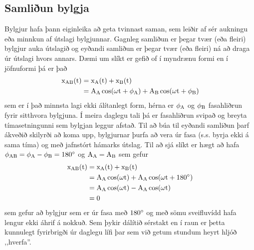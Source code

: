 \subsection{Samliðun bylgja}
Bylgjur hafa þann eiginleika að geta tvinnast saman, sem leiðir af sér aukningu
eða minnkun af útslagi bylgjunnar. Gagnleg samliðun er þegar tvær (eða fleiri)
bylgjur auka útslagið og eyðandi samliðun er þegar tvær (eða fleiri) ná að
draga úr útslagi hvors annars. Dæmi um slíkt er gefið of í myndrænu formi en
í jöfnuformi þá er það
\begin{align*}
	\text{x}_\text{AB}(\textrm{t}) &= \text{x}_\text{A}(\textrm{t}) + \text{x}_\text{B}(\textrm{t}) \\
		&= \text{A}_\text{A} \cos (\omega \textrm{t} + \phi_\text{A}) +
			\text{A}_\text{B} \cos (\omega \textrm{t} + \phi_\text{B}) \\
\end{align*}
sem er í það minnsta lagi ekki álítanlegt form, hérna er $\phi_\text{A}$ og
$\phi_\text{B}$ fasahliðrun fyrir sitthvora bylgjuna. Í meira daglegu tali
þá er fasahliðrun svipað og breyta tímasetningunni sem bylgjan leggur afstað.
Til að búa til eyðandi samliðun þarf ákveðið skilyrði að koma upp, bylgjurnar
þurfa að vera úr fasa (s.s. byrja ekki á sama tíma) og með jafnstórt hámarks útslag.
Til að sjá slíkt er hægt að hafa
$\phi_\text{AB} = \phi_\text{A} - \phi_\text{B} = 180 ^{\circ}$ og
$\text{A}_\text{A} = \text{A}_\text{B}$ sem gefur
\begin{align*}
	\text{x}_\text{AB}(\textrm{t}) &= \text{x}_\text{A}(\textrm{t}) + \text{x}_\text{B}(\textrm{t}) \\
		&= \text{A}_\text{A} \cos (\omega \textrm{t}) +
			\text{A}_\text{A} \cos (\omega \textrm{t} + 180 ^{\circ}) \\
		&= \text{A}_\text{A} \cos (\omega \textrm{t}) -
			\text{A}_\text{A} \cos (\omega \textrm{t}) \\
		&= 0 \\
\end{align*}
sem gefur að bylgjur sem er úr fasa með $180 ^{\circ}$ og með sömu sveifluvídd hafa
lengur ekki áhrif á nokkuð. Sem þykir dálítið sérstakt en í raun er þetta kunnulegt
fyrirbrigði úr daglegu lífi þar sem við getum stundum heyrt hljóð ,,hverfa''.

%

